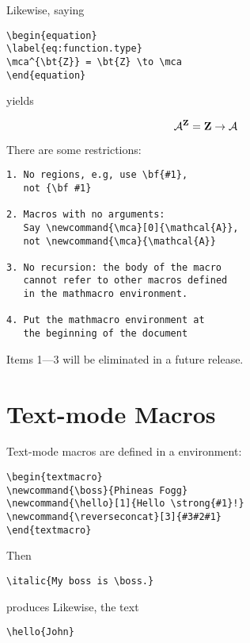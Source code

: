 Likewise, saying

\begin{verbatim}
\begin{equation}
\label{eq:function.type}
\mca^{\bt{Z}} = \bt{Z} \to \mca
\end{equation}
\end{verbatim}

yields

\begin{equation}
\label{eq:function.type}
\mca^{\bt{Z}} = \bt{Z} \to \mca
\end{equation}

There are some restrictions:

\begin{verbatim}
1. No regions, e.g, use \bf{#1},
   not {\bf #1}

2. Macros with no arguments:
   Say \newcommand{\mca}[0]{\mathcal{A}},
   not \newcommand{\mca}{\mathcal{A}}

3. No recursion: the body of the macro
   cannot refer to other macros defined
   in the mathmacro environment.

4. Put the mathmacro environment at
   the beginning of the document
\end{verbatim}

Items 1—3 will be eliminated in a
future release.

\section{Text-mode Macros}

Text-mode macros are defined in a  environment:

\begin{verbatim}
\begin{textmacro}
\newcommand{\boss}{Phineas Fogg}
\newcommand{\hello}[1]{Hello \strong{#1}!}
\newcommand{\reverseconcat}[3]{#3#2#1}
\end{textmacro}
\end{verbatim}

Then

\begin{verbatim}
\italic{My boss is \boss.}
\end{verbatim}

produces 
Likewise, the text

\begin{verbatim}
\hello{John}
\end{verbatim}

